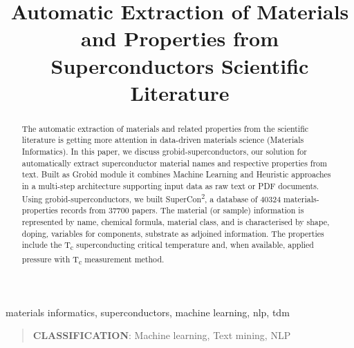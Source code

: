 \documentclass[]{interact}
\theoremstyle{plain}%
\theoremstyle{definition}
\theoremstyle{remark}
\begin{document}

\title{Automatic Extraction of Materials and Properties from Superconductors Scientific Literature}

\author{
}


\maketitle

\begin{abstract}
The automatic extraction of materials and related properties from the scientific literature is getting more attention in data-driven materials science (Materials Informatics). 
In this paper, we discuss grobid-superconductors, our solution for automatically extract superconductor material names and respective properties from text.
Built as Grobid module it combines Machine Learning and Heuristic approaches in a multi-step  architecture supporting input data as raw text or PDF documents. 
Using grobid-superconductors, we built SuperCon\textsuperscript{2}, a database of 40324 materials-properties records from 37700 papers. 
The material (or sample) information is represented by name, chemical formula, material class, and is characterised by shape, doping, variables for components, substrate as adjoined information.
The properties include the T\textsubscript{c} superconducting critical temperature and, when available, applied pressure with T\textsubscript{c} measurement method.
\end{abstract}

\begin{keywords}
materials informatics, superconductors, machine learning, nlp, tdm
\end{keywords}

\begin{quote}
    \textbf{CLASSIFICATION}: Machine learning, Text mining, NLP
\end{quote}
\end{document}
